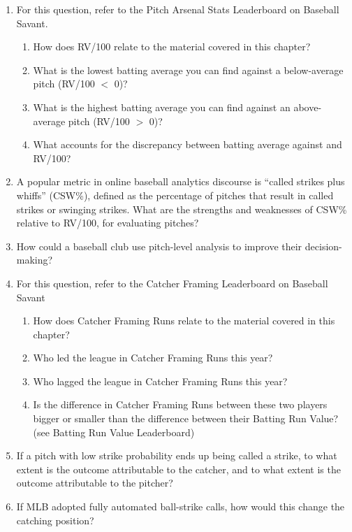 \documentclass{article}
\begin{document}
  \begin{enumerate}
    \item For this question, refer to the Pitch Arsenal Stats Leaderboard on Baseball Savant.
    \begin{enumerate}
      \item How does RV/100 relate to the material covered in this chapter?
      \item What is the lowest batting average you can find against a below-average pitch (RV/100 $<$ 0)?
      \item What is the highest batting average you can find against an above-average pitch (RV/100 $>$ 0)?
      \item What accounts for the discrepancy between batting average against and RV/100?
    \end{enumerate}
    \item A popular metric in online baseball analytics discourse is ``called strikes plus whiffs'' (CSW\%), defined as the percentage of pitches that result in called strikes or swinging strikes. What are the strengths and weaknesses of CSW\% relative to RV/100, for evaluating pitches?
    \item How could a baseball club use pitch-level analysis to improve their decision-making?
    \item For this question, refer to the Catcher Framing Leaderboard on Baseball Savant
    \begin{enumerate}
      \item How does Catcher Framing Runs relate to the material covered in this chapter?
      \item Who led the league in Catcher Framing Runs this year?
      \item Who lagged the league in Catcher Framing Runs this year?
      \item Is the difference in Catcher Framing Runs between these two players bigger or smaller than the difference between their Batting Run Value? (see Batting Run Value Leaderboard)
    \end{enumerate}
    \item If a pitch with low strike probability ends up being called a strike, to what extent is the outcome attributable to the catcher, and to what extent is the outcome attributable to the pitcher?
    \item If MLB adopted fully automated ball-strike calls, how would this change the catching position?
  \end{enumerate}
\end{document}
